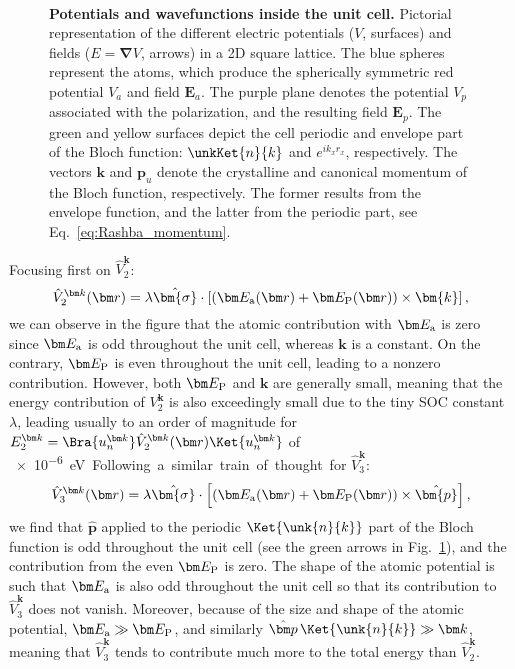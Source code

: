 \begin{figure}[h]
~\centering
{}\caption{\label{fig:Efield_cell_drawing}{\bf Potentials and wavefunctions inside the unit cell.} Pictorial representation of the different electric potentials ($V$, surfaces) and fields ($E=\bm \nabla V$, arrows) in a 2D square lattice. The blue spheres represent the atoms, which produce the spherically symmetric red potential $V_a$ and field $\bm E_a$. The purple plane denotes the potential $V_p$ associated with the polarization, and the resulting field $\bm E_p$. The green and yellow surfaces depict the cell periodic and envelope part of the Bloch function: $\unkKet{n}{k}$ and $e^{ik_x r_x}$, respectively. The vectors $\bm k$ and $\bm p_u$ denote the crystalline and canonical momentum of the Bloch function, respectively.
The former results from the envelope function, and the latter from the periodic part, see Eq.~\eqref{eq:Rashba_momentum}.}
\end{figure}    
Focusing first on $\hat{V}^{\bm k}_2$:
\begin{equation}
	\label{eq:Rashba_purerel}
	\hat{V}^{\bm k}_2(\bm r) = \lambda \hat{\bm{\sigma}} \cdot \left[ (\bm E_{\rm a}(\bm r) + \bm E_{\rm P}(\bm r)) \times \bm{k}\right],
\end{equation}
we can observe in the figure that the atomic contribution with $\bm E_{\rm a}$ is zero since $\bm E_{\rm a}$ is odd throughout the unit cell, whereas $\bm k$ is a constant.
On the contrary, $\bm E_{\rm P}$ is even throughout the unit cell, leading to a nonzero contribution.
However, both $\bm E_{\rm P}$ and $\bm k$ are generally small, meaning that the energy contribution of $V^{\bm k}_2$ is also exceedingly small due to the tiny \gls{SOC} constant $\lambda$, leading usually to an order of magnitude for $E^{\bm k}_2 = \Bra{u_n^{\bm k}} \hat{V}_2^{\bm k}(\bm r) \Ket{u_n^{\bm k}}$ of \SI{e-6}eV.
    
Following a similar train of thought for $\hat{V}^{\bm k}_3$:
\begin{equation}
	\label{eq:Rashba_SOC}
	\hat{V}^{\bm k}_3(\bm r) = \lambda \hat{\bm{\sigma}} \cdot \left[ (\bm E_{\rm a}(\bm r) + \bm E_{\rm P}(\bm r)) \times \hat{\bm{p}}\right],
\end{equation}
we find that $\hat{\bm p}$ applied to the periodic $\Ket{\unk{n}{k}}$ part of the Bloch function is odd throughout the unit cell (see the green arrows in Fig.~\ref{fig:Efield_cell_drawing}), and the contribution from the even $\bm E_{\rm P}$ is zero.
The shape of the atomic potential is such that $\bm E_{\rm a}$ is also odd throughout the unit cell so that its contribution to $\hat{V}^{\bm k}_3$ does not vanish.
Moreover, because of the size and shape of the atomic potential, $\bm E_{\rm a} \gg \bm E_{\rm P}$, and similarly $\hat{\bm p}\,\Ket{\unk{n}{k}} \gg \bm k$, meaning that $\hat{V}^{\bm k}_3$ tends to contribute much more to the total energy than $\hat{V}^{\bm k}_2$.

